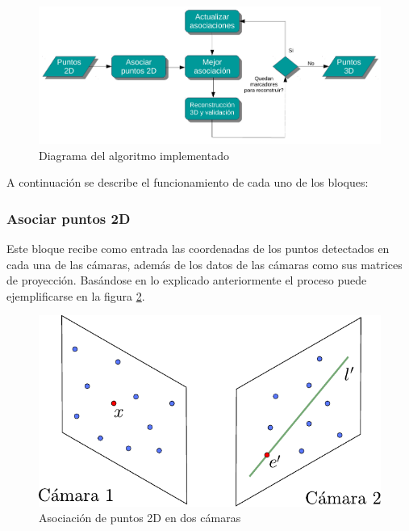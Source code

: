 \begin{figure}[H]
\begin{center}
\includegraphics[scale=0.6]{img/Reconstruccion/diagrama_algoritmo.pdf}
\end{center}
\caption{Diagrama del algoritmo implementado}
\label{fig: diagrama algoritmo}
\end{figure}

A continuación se describe el funcionamiento de cada uno de los bloques:

\subsubsection*{Asociar puntos 2D}

Este bloque recibe como entrada las coordenadas de los puntos detectados en cada una de las cámaras, además de los datos de las cámaras como sus matrices de proyección. Basándose en lo explicado anteriormente el proceso puede ejemplificarse en la figura \ref{fig: cam2cam }. \\

\begin{figure}[H]
\begin{center}
\includegraphics[scale=0.7]{img/Reconstruccion/cam2cam.pdf}
\end{center}
\caption{Asociación de puntos 2D en dos cámaras}
\label{fig: cam2cam }
\end{figure}

